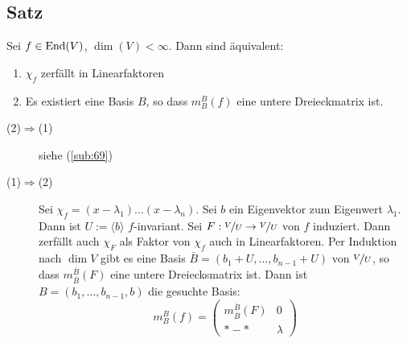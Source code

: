 \subsection[Satz: Zerfallen in Linearfaktoren <-> Gestalt der Matrix]{Satz} %
\label{sub:610}
Sei $f \in \operatorname{End}(V)$, $\dim (V) < \infty$. Dann sind äquivalent: 
\begin{enumerate}[(1)]
	\item $\chi_f$ zerfällt in Linearfaktoren
	\item Es existiert eine Basis $B$, so dass $m_B^B(f)$ eine untere Dreieckmatrix ist.
\end{enumerate}
\begin{description}
	\item[(2)$\Rightarrow$(1)] siehe (\ref{sub:69})
	\item[(1)$\Rightarrow$(2)] Sei $\chi_f = (x- \lambda_1) \ldots (x-\lambda_n)$. Sei $b$ ein Eigenvektor zum Eigenwert $\lambda_1$. Dann  ist $U := \langle b \rangle$
	$f$-invariant. Sei $F : \nicefrac{V}{U} \to \nicefrac{V}{U}$ von $f$ induziert. Dann zerfällt auch $\chi_F$ als Faktor von $\chi_f$ auch in Linearfaktoren. Per
	Induktion nach $\dim V$ gibt es eine Basis $\overline{B} = (b_1 + U , \ldots , b_{n-1} + U)$ von $\nicefrac{V}{U}$, so dass $m_{\overline{B}}^{\overline{B}} (F)$
	eine untere Dreiecksmatrix ist. Dann ist $B=( b_1, \ldots , b_{n-1}, b)$ die gesuchte Basis:
	\[
		m_B^B(f) = \begin{pmatrix}
			m_{\overline{B}}^{\overline{B}} (F) & 0 \\
			*-* & \lambda 
		\end{pmatrix} \tag*{$\square$}
	\]
\end{description}

